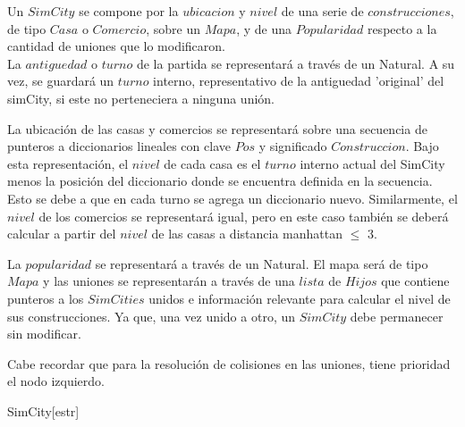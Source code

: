 \begin{Representacion}
  
Un $SimCity$ se compone por la $ubicacion$ y $nivel$ de una serie de $construcciones$, de tipo $Casa$ o $Comercio$, sobre un $Mapa$, y de una $Popularidad$ respecto a la cantidad de uniones que lo modificaron. \\

La $antiguedad$ o $turno$ de la partida se representará a través de un Natural. A su vez, se guardará un $turno$ interno, representativo de la antiguedad 'original' del simCity, si este no perteneciera a ninguna unión. 

La ubicación de las casas y comercios se representará sobre una secuencia de punteros a diccionarios lineales con clave $Pos$ y significado $Construccion$. Bajo esta representación, el $nivel$ de cada casa es el $turno$ interno actual del SimCity menos la posición del diccionario donde se encuentra definida en la secuencia. Esto se debe a que en cada turno se agrega un diccionario nuevo. Similarmente, el $nivel$ de los comercios se representará igual, pero en este caso también se deberá calcular a partir del $nivel$ de las casas a distancia  manhattan $\leq$ 3. 

La $popularidad$ se representará a través de un Natural. El mapa será de tipo $Mapa$ y las uniones se representarán a través de una $lista$ de $Hijos$ que contiene punteros a los $SimCities$ unidos e información relevante para calcular el nivel de sus construcciones. Ya que, una vez unido a otro, un $SimCity$ debe permanecer sin modificar. 

Cabe recordar que para la resolución de colisiones en las uniones, tiene prioridad el nodo izquierdo. 

    \begin{Estructura}{SimCity}[estr]
        \begin{Tupla}[estr]
        \end{Tupla}
        
        \vspace{2mm}
        \begin{Tupla}[hijo]
        \end{Tupla}
        

\end{Estructura}
\end{Representacion}
